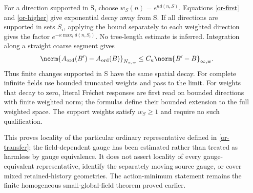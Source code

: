 For a direction supported in S, choose
$w_S(n)=e^{\kappa d(n,S)}$. Equations \eqref{or-first} and
\eqref{or-higher} give exponential decay away from S. If all
directions are supported in sets $S_i$, applying the bound
separately to each weighted direction gives the factor
$e^{-\kappa\max_i d(n,S_i)}$. No tree-length estimate is inferred.
Integration along a straight coarse segment gives
\begin{equation}\label{or-finite-change}
 \norm{A_{\rm ord}(B')-A_{\rm ord}(B)}_{N_{\alpha,w}}
       \le C_\kappa\norm{B'-B}_{\infty,w}.
\end{equation}
Thus finite changes supported in S have the same spatial decay.
For complete infinite fields use bounded truncated weights and
pass to the limit. For weights that decay to zero, literal
Fr\'echet responses are first read on bounded directions with
finite weighted norm; the formulas define their bounded extension
to the full weighted space. The support weights satisfy $w_S\ge1$
and require no such qualification.

This proves locality of the particular ordinary representative
defined in \eqref{or-transfer}; the field-dependent gauge has been
estimated rather than treated as harmless by gauge equivalence.
It does not assert locality of every gauge-equivalent representative,
identify the separately moving source gauge, or cover mixed
retained-history geometries. The action-minimum statement remains
the finite homogeneous small-global-field theorem proved earlier.

